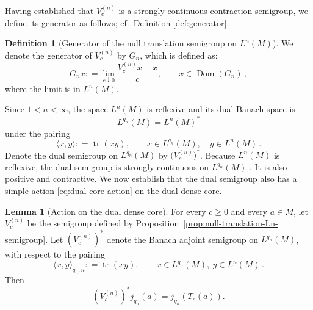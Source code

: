 \documentclass[11pt,a4paper]{article}
\theoremstyle{plain}
\numberwithin{theorem}{section}
\theoremstyle{definition}
\newtheorem{definition}[theorem]{Definition}
\newtheorem{lemma}[theorem]{Lemma}
\newcommand{\?}{\overset{?}{=}}
\newcommand{\defeq}{\mathrel{\mathop:}=}
\DeclareMathOperator{\tr}{tr}
\DeclareMathOperator{\Dom}{Dom}
\begin{document}
Having established that $V_c^{(n)}$ is a strongly continuous contraction semigroup, we define its generator as follows; cf.~Definition \ref{def:generator}.
\begin{definition}[Generator of the null translation semigroup on $L^n(M)$]\label{def:Gn-def}
    We denote the generator of $V_c^{(n)}$ by $G_n$, which is defined as:
    \[  
    G_n x\defeq \lim_{c\downarrow 0}\frac{V_c^{(n)}x-x}{c},\qquad x\in\Dom(G_n)\,,
    \]
    where the limit is in $L^n(M)$.
\end{definition}


Since $1<n<\infty$, the space $L^{n}(M)$ is reflexive \cite{Pisier:2003dsk} and its dual Banach space is
\begin{equation}
  L^{q_n}(M)=L^n(M)^*
\end{equation}
under the pairing
\begin{equation}
  \langle x,y\rangle\defeq \tr(xy),\qquad x\in L^{q_n}(M),\quad y\in L^n(M)\,.
\end{equation}
Denote the dual semigroup on $L^{q_n}(M)$ by $\bigl(V_c^{(n)}\bigr)^*$.
Because $L^{n}(M)$ is reflexive, the dual semigroup is strongly continuous on $L^{q_n}(M)$ \cite{phillips1955adjoint,engel.nagel:00:one-parameter}.  It is also positive and contractive. We now establish that the dual semigroup also has a simple action \eqref{eq:dual-core-action} on the dual dense core.


\begin{lemma}[Action on the dual dense core]\label{lem:dual-core-action-fixed}
For every \(c\geq 0\) and every \(a\in M\), let $V_c^{(n)}$ be the semigroup defined by Proposition~\ref{prop:null-translation-Ln-semigroup}. Let \((V_c^{(n)})^*\) denote the Banach adjoint semigroup on
\(L^{q_n}(M)\), with respect to the pairing
\[
        \langle x,y\rangle_{q_n,n}\defeq \tr (xy),
        \qquad x\in L^{q_n}(M),\ y\in L^n(M)\,.
\]
Then
\begin{equation}\label{eq:dual-core-action}
    (V_c^{(n)})^*j_{q_n}(a)=j_{q_n}(T_c(a)).
\end{equation}
\end{lemma}
\end{document}
